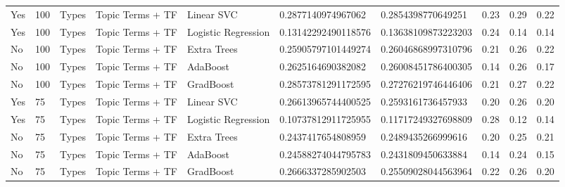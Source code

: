 \begin{table}[]
\begin{tabular}{@{}llllllllll@{}}
    Yes                 & 100             & Types                 & Topic Terms + TF      & Linear SVC          & 0.2877140974967062      & 0.2854398770649251     & 0.23               & 0.29            & 0.22              \\
    Yes                 & 100             & Types                 & Topic Terms + TF      & Logistic Regression & 0.13142292490118576     & 0.13638109873223203    & 0.24               & 0.14            & 0.14              \\
    No                  & 100             & Types                 & Topic Terms + TF      & Extra Trees         & 0.25905797101449274     & 0.26046868997310796    & 0.21               & 0.26            & 0.22              \\
    No                  & 100             & Types                 & Topic Terms + TF      & AdaBoost            & 0.2625164690382082      & 0.26008451786400305    & 0.14               & 0.26            & 0.17              \\
    No                  & 100             & Types                 & Topic Terms + TF      & GradBoost           & 0.28573781291172595     & 0.27276219746446406    & 0.21               & 0.27            & 0.22              \\
    Yes                 & 75              & Types                 & Topic Terms + TF      & Linear SVC          & 0.26613965744400525     & 0.2593161736457933     & 0.20               & 0.26            & 0.20              \\
    Yes                 & 75              & Types                 & Topic Terms + TF      & Logistic Regression & 0.10737812911725955     & 0.11717249327698809    & 0.28               & 0.12            & 0.14              \\
    No                  & 75              & Types                 & Topic Terms + TF      & Extra Trees         & 0.2437417654808959      & 0.2489435266999616     & 0.20               & 0.25            & 0.21              \\
    No                  & 75              & Types                 & Topic Terms + TF      & AdaBoost            & 0.24588274044795783     & 0.2431809450633884     & 0.14               & 0.24            & 0.15              \\
    No                  & 75              & Types                 & Topic Terms + TF      & GradBoost           & 0.2666337285902503      & 0.25509028044563964    & 0.22               & 0.26            & 0.20              \\

\end{tabular}
\end{table}
